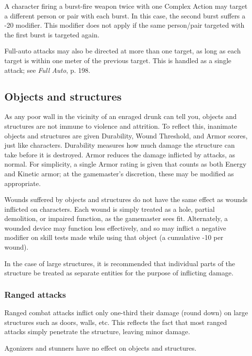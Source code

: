 A character firing a burst-fire weapon twice with one Complex Action may target a different person or pair with each burst. In this case, the second burst suffers a -20 modifier. This modifier does not apply if the same person/pair targeted with the first burst is targeted again.

Full-auto attacks may also be directed at more than one target, as long as each target is within one meter of the previous target. This is handled as a single attack; see \emph{Full Auto}, p. 198.


\subsection{Objects and structures}
\label{sec:objects-structures}

As any poor wall in the vicinity of an enraged drunk can tell you, objects and structures are not immune to violence and attrition. To reflect this, inanimate objects and structures are given Durability, Wound Threshold, and Armor scores, just like characters. Durability measures how much damage the structure can take before it is destroyed. Armor reduces the damage inflicted by attacks, as normal. For simplicity, a single Armor rating is given that counts as both Energy and Kinetic armor; at the gamemaster’s discretion, these may be modified as appropriate.

Wounds suffered by objects and structures do not have the same effect as wounds inflicted on characters. Each wound is simply treated as a hole, partial demolition, or impaired function, as the gamemaster sees fit. Alternately, a wounded device may function less effectively, and so may inflict a negative modifier on skill tests made while using that object (a cumulative -10 per wound).

In the case of large structures, it is recommended that individual parts of the structure be treated as separate entities for the purpose of inflicting damage.

\subsubsection{Ranged attacks}

Ranged combat attacks inflict only one-third their damage (round down) on large structures such as doors, walls, etc. This reflects the fact that most ranged attacks simply penetrate the structure, leaving minor damage.

Agonizers and stunners have no effect on objects and structures.

